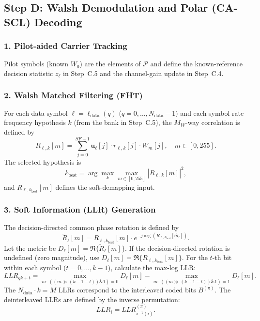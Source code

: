 \documentclass[11pt]{article}
\begin{document}
\subsection{Step D: Walsh Demodulation and Polar (CA-SCL) Decoding}

\subsubsection*{1. Pilot-aided Carrier Tracking}

Pilot symbols (known $W_0$) are the elements of $\mathcal{P}$ and define the known-reference decision statistic $z_\ell$ in Step~C.5 and the channel-gain update in Step~C.4.

\subsubsection*{2. Walsh Matched Filtering (FHT)}

For each data symbol $\ell=\ell_{\text{data}}(q)$ ($q=0,\dots,N_{\text{data}}-1$) and each symbol-rate frequency hypothesis $k$ (from the bank in Step~C.5), the $M_W$-way correlation is defined by
\[
  R_{\ell,k}[m]=\sum_{j=0}^{\mathit{SF}-1}\mathbf{u}_{\ell}[j]\cdot r_{\ell,k}[j]\cdot W_m[j],\quad m\in[0,255].
\]
The selected hypothesis is
\[
  k_{\text{best}}=\arg\max_k \max_{m\in[0,255]} |R_{\ell,k}[m]|^2,
\]
and $R_{\ell,k_{\text{best}}}[m]$ defines the soft-demapping input.

\subsubsection*{3. Soft Information (LLR) Generation}

The decision-directed common phase rotation is defined by
\[
  \widetilde R_{\ell}[m] = R_{\ell,k_{\text{best}}}[m]\cdot e^{-j\arg\!\left(R_{\ell,k_{\text{best}}}[\hat m_\ell]\right)}.
\]
Let the metric be $D_{\ell}[m]=\Re\{\widetilde R_{\ell}[m]\}$. If the decision-directed rotation is undefined (zero magnitude), use $D_{\ell}[m]=\Re\{R_{\ell,k_{\text{best}}}[m]\}$. For the $t$-th bit within each symbol ($t=0,\dots,k-1$), calculate the max-log LLR:
\[
  \mathit{LLR}_{qk+t}=\max_{m:\, ((m\gg(k-1-t))\mathbin{\&}1)=0} D_{\ell}[m] - \max_{m:\, ((m\gg(k-1-t))\mathbin{\&}1)=1} D_{\ell}[m].
\]
The $N_{\text{data}}\cdot k=M$ LLRs correspond to the interleaved coded bits $B^{(\pi)}$. The deinterleaved LLRs are defined by the inverse permutation:
\[
  \mathit{LLR}_i = \mathit{LLR}^{(\pi)}_{\pi^{-1}(i)}.
\]
\end{document}
